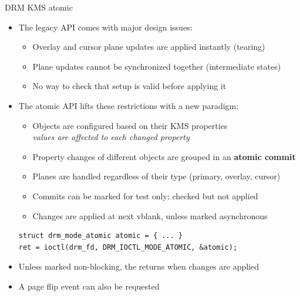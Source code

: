 \begin{frame}[fragile]{DRM KMS atomic}
  \begin{itemize}
  \item The legacy API comes with major design issues:
    \begin{itemize}
    \item Overlay and cursor plane updates are applied instantly (tearing)
    \item Plane updates cannot be synchronized together (intermediate states)
    \item No way to check that setup is valid before applying it
    \end{itemize}
  \item The atomic API lifts these restrictions with a new paradigm:
    \begin{itemize}
    \item Objects are configured based on their KMS properties\\
    \textit{values are affected to each changed property}
    \item Property changes of different objects are grouped in an \textbf{atomic commit}
    \item Planes are handled regardless of their type (primary, overlay, cursor)
    \item Commits can be marked for test only: checked but not applied
    \item Changes are applied at next vblank, unless marked asynchronous
    \end{itemize}
  \begin{verbatim}
struct drm_mode_atomic atomic = { ... }
ret = ioctl(drm_fd, DRM_IOCTL_MODE_ATOMIC, &atomic);
  \end{verbatim}
  \item Unless marked non-blocking, the  returns when changes are applied
  \item A page flip event can also be requested
  \end{itemize}
\end{frame}

